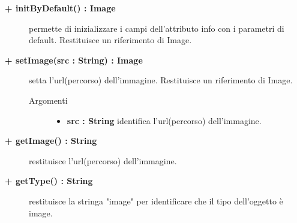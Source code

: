 \begin{description}
\begin{description}
\end{description}

\begin{description}
		\item[\textbf{\color{blue}+ initByDefault() : Image			}] \hfill
			permette di inizializzare i campi dell'attributo info con i parametri di default. Restituisce un riferimento di Image. 

\end{description}

\begin{description}
		\item[\textbf{\color{blue}+ setImage(src : String) : Image			}] \hfill
			setta l'url(percorso) dell'immagine. Restituisce un riferimento di Image.
			
		\begin{description}
			\item[Argomenti] \hfill
				\begin{itemize}
				
					\item \textbf{src : String			} \hfill
					identifica l'url(percorso) dell'immagine.
				\end{itemize}
		\end{description}

\end{description}

\begin{description}
		\item[\textbf{\color{blue}+ getImage() : String			}] \hfill
			restituisce l'url(percorso) dell'immagine. 

\end{description}

\begin{description}
		\item[\textbf{\color{blue}+ getType() : String			}] \hfill
			restituisce la stringa "image" per identificare che il tipo dell'oggetto è image. 

\end{description}



\end{description}


